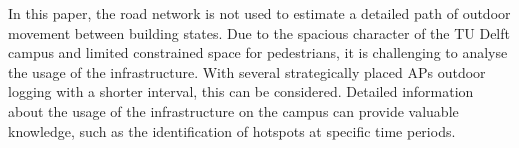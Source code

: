 In this paper, the road network is not used to estimate a detailed path of outdoor movement between building states. Due to the spacious character of the TU Delft campus and limited constrained space for pedestrians, it is challenging to analyse the usage of the infrastructure. With several strategically placed APs outdoor logging with a shorter interval, this can be considered. Detailed information about the usage of the infrastructure on the campus can provide valuable knowledge, such as the identification of hotspots at specific time periods. 
